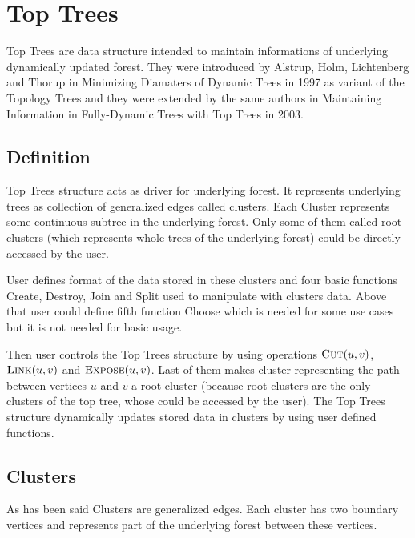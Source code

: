 \chapter{Top Trees}

Top Trees are data structure intended to maintain informations of underlying
dynamically updated forest. They were introduced by Alstrup, Holm, Lichtenberg
and Thorup in {\I Minimizing Diamaters of Dynamic Trees}
\cite{MinimizingDiamatersOfDynamicTrees} in 1997 as variant of the Topology
Trees and they were extended by the same authors in
{\I Maintaining Information in Fully-Dynamic Trees with Top Trees} \cite{TopTrees} in 2003.

\section{Definition}

{\I Top Trees structure} acts as driver for underlying forest. It represents
underlying trees as collection of generalized edges called {\I clusters}. Each
{\I Cluster} represents some continuous subtree in the underlying forest. Only
some of them called {\I root clusters} (which represents whole trees of the
underlying forest) could be directly accessed by the user.

User defines format of the data stored in these clusters and four basic
functions {\sc Create}, {\sc Destroy}, {\sc Join} and {\sc Split} used to
manipulate with clusters data. Above that user could define fifth function
{\sc Choose} which is needed for some use cases but it is not needed for basic
usage.

Then user controls the Top Trees structure by using operations $\hbox{\sc Cut}(u,v)$,
$\hbox{\sc Link}(u,v)$ and $\hbox{\sc Expose}(u,v)$. Last of them
makes cluster representing the path between vertices $u$ and $v$ a root cluster
(because root clusters are the only clusters of the top tree, whose could be
accessed by the user). The Top Trees structure dynamically updates stored data
in clusters by using user defined functions.




\section{Clusters}

As has been said {\I Clusters} are generalized edges. Each cluster has two
{\I boundary vertices} and represents part of the underlying forest between
these vertices.

